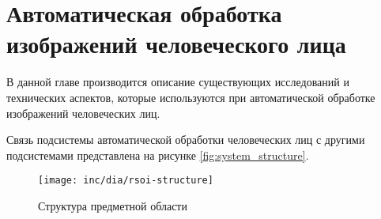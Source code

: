 \section{Автоматическая обработка изображений человеческого лица}

В данной главе производится описание существующих исследований и технических аспектов, которые используются при автоматической обработке изображений человеческих лиц.

Связь подсистемы автоматической обработки человеческих лиц с другими подсистемами представлена на рисунке \ref{fig:system_structure}.

\begin{figure}
  \centering
  \texttt{[image: inc/dia/rsoi-structure]}
  \caption{Структура предметной области}
  \label{fig:structure}
\end{figure}



